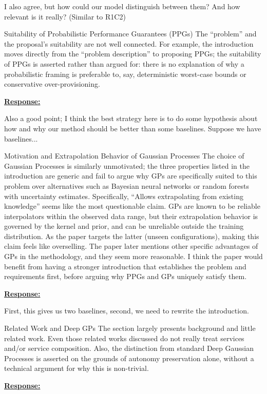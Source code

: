 \documentclass{article}
\newcommand{\Response}[1][]{%
    \noindent\underline{\textbf{Response:}}\par\vspace{0.2cm}%
    #1\par\vspace{0.6cm}%
}
\begin{document}
I also agree, but how could our model distinguish between them? And how relevant is it really? (Similar to R1C2)


\begin{cmt}{Suitability of Probabilistic Performance Guarantees (PPGs)}{}
The ``problem'' and the proposal's suitability are not well connected. For example, the introduction moves directly from the ``problem description'' to proposing PPGs; the suitability of PPGs is asserted rather than argued for: there is no explanation of why a probabilistic framing is preferable to, say, deterministic worst-case bounds or conservative over-provisioning. 
\end{cmt}
\Response

Also a good point; I think the best strategy here is to do some hypothesis about how and why our method should be better than some baselines. Suppose we have baselines...

\begin{cmt}{Motivation and Extrapolation Behavior of Gaussian Processes}{}
The choice of Gaussian Processes is similarly unmotivated; the three properties listed in the introduction are generic and fail to argue why GPs are specifically suited to this problem over alternatives such as Bayesian neural networks or random forests with uncertainty estimates. 
%
Specifically, ``Allows extrapolating from existing knowledge'' seems like the most questionable claim. GPs are known to be reliable interpolators within the observed data range, but their extrapolation behavior is governed by the kernel and prior, and can be unreliable outside the training distribution. As the paper targets the latter (unseen configurations), making this claim feels like overselling. The paper later mentions other specific advantages of GPs in the methodology, and they seem more reasonable. I think the paper would benefit from having a stronger introduction that establishes the problem and requirements first, before arguing why PPGs and GPs uniquely satisfy them.
\end{cmt}
\Response

First, this gives us two baselines, second, we need to rewrite the introduction.

\begin{cmt}{Related Work and Deep GPs}{}
The section largely presents background and little related work. Even those related works discussed do not really treat services and/or service composition. Also, the distinction from standard Deep Gaussian Processes is asserted on the grounds of autonomy preservation alone, without a technical argument for why this is non-trivial.
\end{cmt}
\Response
\end{document}
